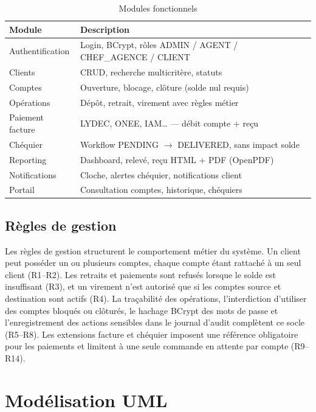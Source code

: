 \documentclass[11pt,a4paper,oneside]{report}
\begin{document}
\begin{table}[H]
    \centering
    \caption{Modules fonctionnels}
    \label{tab:fonctionnalites}
    \small
    \begin{tabular}{@{}p{3cm}p{9.5cm}@{}}
        \rowcolor{AmanaBrown}
        \color{white}\textbf{Module} & \textbf{Description} \\
        \midrule
        Authentification & Login, BCrypt, rôles ADMIN / AGENT / CHEF\_AGENCE / CLIENT \\
        Clients & CRUD, recherche multicritère, statuts \\
        Comptes & Ouverture, blocage, clôture (solde nul requis) \\
        Opérations & Dépôt, retrait, virement avec règles métier \\
        Paiement facture & LYDEC, ONEE, IAM… — débit compte + reçu \\
        Chéquier & Workflow PENDING $\rightarrow$ DELIVERED, sans impact solde \\
        Reporting & Dashboard, relevé, reçu HTML + PDF (OpenPDF) \\
        Notifications & Cloche, alertes chéquier, notifications client \\
        Portail & Consultation comptes, historique, chéquiers \\
        \bottomrule
    \end{tabular}
\end{table}

\subsection{Règles de gestion}

Les règles de gestion structurent le comportement métier du système. Un client peut posséder un ou plusieurs comptes, chaque compte étant rattaché à un seul client (R1--R2). Les retraits et paiements sont refusés lorsque le solde est insuffisant (R3), et un virement n'est autorisé que si les comptes source et destination sont actifs (R4). La traçabilité des opérations, l'interdiction d'utiliser des comptes bloqués ou clôturés, le hachage BCrypt des mots de passe et l'enregistrement des actions sensibles dans le journal d'audit complètent ce socle (R5--R8). Les extensions facture et chéquier imposent une référence obligatoire pour les paiements et limitent à une seule commande en attente par compte (R9--R14).

\section{Modélisation UML}
\end{document}
